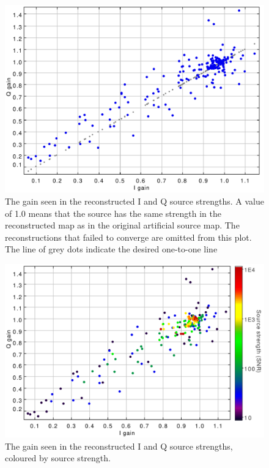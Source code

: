 \documentclass[twoside,11pt]{starlink}
\begin{document}
\begin{figure}
\includegraphics[width=0.9\columnwidth]{figs/iqgain}
\caption{The gain seen in the reconstructed I and Q source strengths. A
value of 1.0 means that the source has the same strength in the
reconstructed map as in the original artificial source map. The
reconstructions that failed to converge are omitted from this plot. The
line of grey dots indicate the desired one-to-one line}
\label{fig:iqgain}
\end{figure}


\begin{figure}
\includegraphics[width=0.9\columnwidth]{figs/iqgain-snr}
\caption{The gain seen in the reconstructed I and Q source strengths,
coloured by source strength.}
\label{fig:iqgain-snr}
\end{figure}
\end{document}

